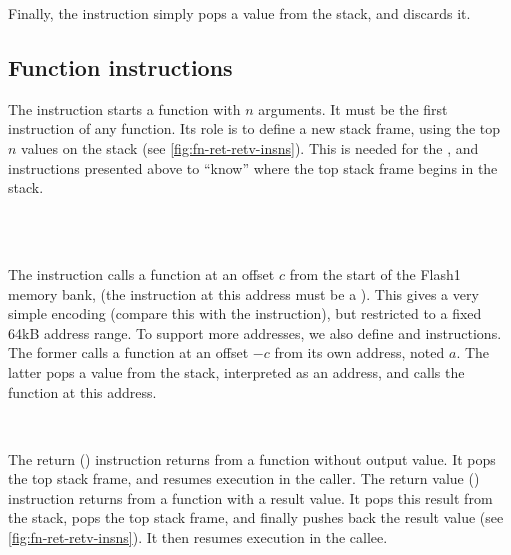 \begin{Paragraph}
\end{Paragraph}

Finally, the  instruction simply pops a value from the stack, and
discards it.

\subsection{Function instructions}\label{subsection:fn-instructions}

\begin{Paragraph}[]
\end{Paragraph}

The  instruction starts a function with $n$ arguments. It must be the
first instruction of any function. Its role is to define a new stack frame,
using the top $n$ values on the stack (see \cref{fig:fn-ret-retv-insns}). This
is needed for the ,  and  instructions presented
above to ``know'' where the top stack frame begins in the stack.

\begin{Paragraph}
\\
\\
\end{Paragraph}

The  instruction calls a function at an offset $c$ from the start of
the Flash1 memory bank,  (the instruction at this address must be a
). This gives a very simple encoding (compare this with the 
instruction), but restricted to a fixed 64kB address range. To support more
addresses, we also define  and  instructions. The
former calls a function at an offset $-c$ from its own address, noted $a$. The
latter pops a value from the stack, interpreted as an address, and calls the
function at this address.

\begin{Paragraph}
\\
\end{Paragraph}

The return () instruction returns from a function without output
value. It pops the top stack frame, and resumes execution in the caller. The
return value () instruction returns from a function with a result
value. It pops this result from the stack, pops the top stack frame, and
finally pushes back the result value (see \cref{fig:fn-ret-retv-insns}). It
then resumes execution in the callee.

